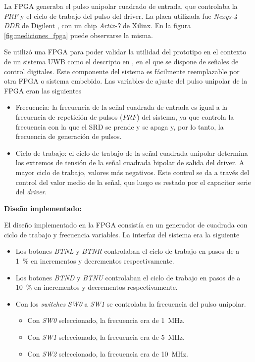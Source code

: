La FPGA generaba el pulso unipolar cuadrado de entrada, que controlaba la
$PRF$ y el ciclo de trabajo del pulso del driver. La placa utilizada fue
\textit{Nexys-4 DDR} de Digilent \cite{digilent_nexys4ddr}, con un chip
\textit{Artix-7} de Xilinx. En la figura \ref{fig:mediciones_fpga} puede
observarse la misma. 

Se utilizó una FPGA para poder validar la utilidad del prototipo en el contexto
de un sistema UWB como el descripto en \cite{altieri2017}, en el que se dispone
de señales de control digitales. Este componente del sistema es fácilmente
reemplazable por otra FPGA o sistema embebido. Las variables de ajuste del pulso
unipolar de la FPGA eran las siguientes

\begin{itemize}
  \item Frecuencia: la frecuencia de la señal cuadrada de entrada es igual a la
    frecuencia de repetición de pulsos ($PRF$) del sistema, ya que controla la
    frecuencia con la que el SRD se prende y se apaga y, por lo tanto,
    la frecuencia de generación de pulsos.
  \item Ciclo de trabajo: el ciclo de trabajo de la señal cuadrada unipolar
    determina los extremos de tensión de la señal cuadrada bipolar de salida del
    driver. A mayor ciclo de trabajo, valores más negativos. Este control se da
    a través del control del valor medio de la señal, que luego es restado por
    el capacitor serie del \textit{driver}.
\end{itemize}

\textbf{Diseño implementado:}

El diseño implementado en la FPGA consistía en un generador de cuadrada con
ciclo de trabajo y frecuencia variables. La interfaz del sistema era la
siguiente

\begin{itemize}
  \item Los botones \textit{BTNL} y \textit{BTNR} controlaban el ciclo de
    trabajo en pasos de a \qty{1}{\percent} en incrementos y decrementos
    respectivamente.
  \item Los botones \textit{BTND} y \textit{BTNU} controlaban el ciclo de
    trabajo en pasos de a \qty{10}{\percent} en incrementos y decrementos
    respectivamente.
  \item Con los \textit{switches} \textit{SW0} a \textit{SW1} se controlaba la
    frecuencia del pulso unipolar.
    \begin{itemize}
      \item Con \textit{SW0} seleccionado, la frecuencia era de
        \qty{1}{\mega\hertz}.
      \item Con \textit{SW1} seleccionado, la frecuencia era de
        \qty{5}{\mega\hertz}.
      \item Con \textit{SW2} seleccionado, la frecuencia era de
        \qty{10}{\mega\hertz}.
    \end{itemize}
\end{itemize}

